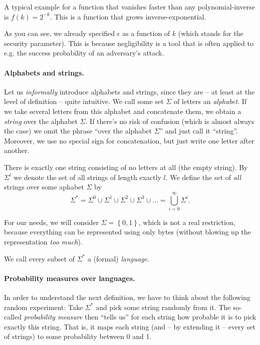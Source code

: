 \message{ !name(seminar.tex)}\documentclass{llncs}
\begin{document}
A typical example for a function that vanishes faster than any polynomial-inverse is $f(k)=2^{-k}$. This is a function that grows inverse-exponential.

As you can see, we already specified $\epsilon$ as a function of $k$ (which stands for the security parameter). This is because negligibility is a tool that is often applied to e.g. the success probability of an adversary's attack.

\paragraph{Alphabets and strings.}

Let us \emph{informally} introduce alphabets and strings, since they are -- at least at the level of definition -- quite intuitive. We call some set $\Sigma$ of letters an \emph{alphabet}. If we take several letters from this alphabet and concatenate them, we obtain a \emph{string} over the alphabet $\Sigma$. If there's no risk of confusion (which is almost always the case) we omit the phrase ``over the alphabet $\Sigma$'' and just call it ``string''. Moreover, we use no special sign for concatenation, but just write one letter after another.

There is exactly one string consisting of no letters at all (the empty string). By $\Sigma^l$ we denote the set of all strings of length exactly $l$. We define the set of \emph{all} strings over some aphabet $\Sigma$ by
\begin{equation*}
\Sigma^*=\Sigma^0\cup\Sigma^1\cup\Sigma^2\cup\Sigma^3\cup\dots=\bigcup_{i=0}^\infty\Sigma^i.
\end{equation*}

For our needs, we will consider $\Sigma=\left\{ 0,1 \right\}$, which is not a real restriction, because everything can be represented using only bytes (without blowing up the representation \emph{too much}).

We call every subset of $\Sigma^*$ a (formal) \emph{language}.

\paragraph{Probability measures over languages.}

In order to understand the next definition, we have to think about the following random experiment: Take $\Sigma^*$ and pick some string randomly from it. The so-called \emph{probability measure} then ``tells us'' for each string how probable it is to pick exactly this string. That is, it maps each string (and -- by extending it -- every set of strings) to some probability between 0 and 1.
\end{document}
